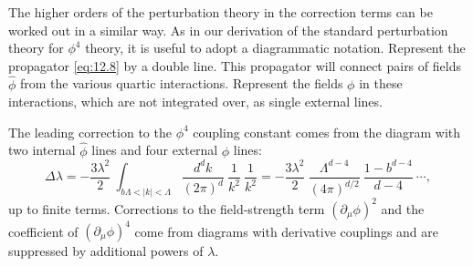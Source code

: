 The higher orders of the perturbation theory in the correction terms can be
worked out in a similar way.  As in our derivation of the standard
perturbation theory for $\phi^4$ theory, it is useful to adopt a diagrammatic
notation.  Represent the propagator \eqref{eq:12.8} by a double line.  This
propagator will connect pairs of fields $\hat{\phi}$ from the various quartic
interactions.  Represent the fields $\phi$ in these interactions, which are
not integrated over, as single external lines.

The leading correction to the $\phi^4$ coupling constant comes from the
diagram with two internal $\hat{\phi}$ lines and four external $\phi$ lines:
\begin{equation}
  \Delta\lambda = -\frac{3\lambda^2}{2}\ \int_{b\Lambda<|k|<\Lambda}
    \frac{d^dk}{(2\pi)^d}\ \frac{1}{k^2}\ \frac{1}{k^2}
  = -\frac{3\lambda^2}{2}\ \frac{\Lambda^{d-4}}{(4\pi)^{d/2}}\ \frac{1-b^{d-4}}
    {d-4}\ \cdots ,
  \label{eq:12.15}
\end{equation}
up to finite terms.  Corrections to the field-strength term $(\partial_\mu\phi)^2$
and the coefficient of $(\partial_\mu\phi)^4$ come from diagrams with derivative
couplings and are suppressed by additional powers of $\lambda$.

